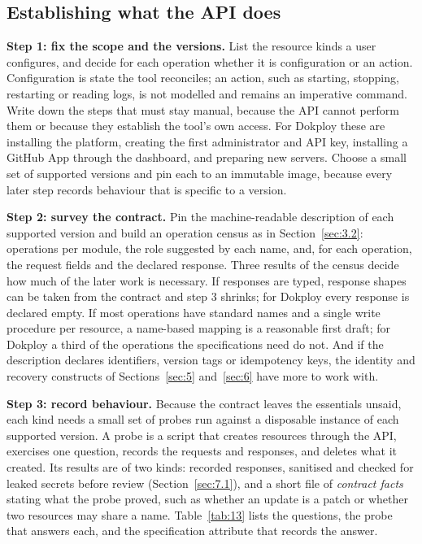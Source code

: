 \subsection{Establishing what the API does}\label{sec:8.1}

\textbf{Step 1: fix the scope and the versions.} List the resource kinds a user configures, and decide for
each operation whether it is configuration or an action. Configuration is state the tool reconciles;
an action, such as starting, stopping, restarting or reading logs, is not modelled and remains an
imperative command. Write down the steps that must stay manual, because the API cannot perform them
or because they establish the tool's own access. For Dokploy these are installing the platform,
creating the first administrator and API key, installing a GitHub App through the dashboard, and
preparing new servers. Choose a small set of supported versions and pin each to an immutable image,
because every later step records behaviour that is specific to a version.

\textbf{Step 2: survey the contract.} Pin the machine-readable description of each supported version and
build an operation census as in Section~\ref{sec:3.2}: operations per module, the role suggested by each name,
and, for each operation, the request fields and the declared response. Three results of the census
decide how much of the later work is necessary. If responses are typed, response shapes can be
taken from the contract and step 3 shrinks; for Dokploy every response is declared empty. If most
operations have standard names and a single write procedure per resource, a name-based mapping is a
reasonable first draft; for Dokploy a third of the operations the specifications need do not. And if
the description declares identifiers, version tags or idempotency keys, the identity and recovery
constructs of Sections~\ref{sec:5} and~\ref{sec:6} have more to work with.

\textbf{Step 3: record behaviour.} Because the contract leaves the essentials unsaid, each kind needs a
small set of probes run against a disposable instance of each supported version. A probe is a script
that creates resources through the API, exercises one question, records the requests and responses,
and deletes what it created. Its results are of two kinds: recorded responses, sanitised and checked
for leaked secrets before review (Section~\ref{sec:7.1}), and a short file of \emph{contract facts} stating what the
probe proved, such as whether an update is a patch or whether two resources may share a name. Table~\ref{tab:13}
lists the questions, the probe that answers each, and the specification attribute that records the
answer.

